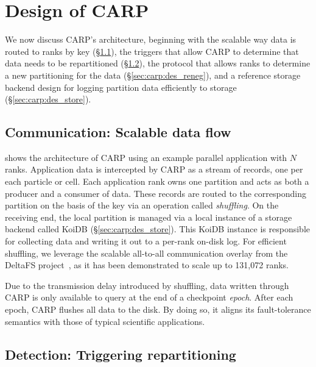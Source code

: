 
\section{Design of CARP}
\label{sec:carp:des}
\figdesarch

We now discuss CARP's architecture, beginning with the scalable way data is routed to ranks by key
(\S\ref{sec:carp:des_comm}), the
triggers that allow CARP to determine that data needs to be repartitioned
(\S\ref{sec:carp:des_detect}), the protocol that allows ranks to determine a new partitioning for
the data (\S\ref{sec:carp:des_reneg}), and a reference storage backend design for logging partition
data efficiently to storage (\S\ref{sec:carp:des_store}).%


\subsection{Communication: Scalable data flow}
\label{sec:carp:des_comm}

 shows the architecture of CARP using an example parallel application
with $N$ ranks.
Application data is intercepted by CARP as a stream of records, one per each particle or cell.
Each application rank owns one partition and acts as both a producer and a consumer of data.
These records are routed to the corresponding partition on the basis of the key via an operation
called \emph{shuffling}.
On the receiving end, the local partition is managed via a local instance of a storage backend
called KoiDB (\S\ref{sec:carp:des_store}).
This KoiDB instance is responsible for collecting data and writing it out to a per-rank on-disk
log.
For efficient shuffling, we leverage the scalable all-to-all communication overlay from the DeltaFS
project~\cite{Zheng2018:DeltaFS}, as it has been demonstrated to scale up to 131,072 ranks.

Due to the transmission delay introduced by shuffling, data written through CARP is only available
to query at the end of a checkpoint \emph{epoch}.
After each epoch, CARP flushes all data to the disk.
By doing so, it aligns its fault-tolerance semantics with those of typical scientific applications.

\figdessend

\subsection{Detection: Triggering repartitioning}
\label{sec:carp:des_detect}

